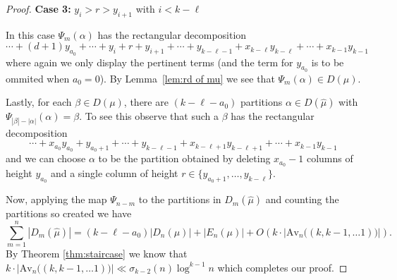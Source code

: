 \documentclass{article}
\theoremstyle{plain}
\newtheorem{lemma}[theorem]{Lemma}
\theoremstyle{definition}
\newcommand{\Av}{\text{Av}}
\begin{document}
\begin{proof}
\medskip\noindent
\textbf{Case 3:} $y_i> r >y_{i+1}$ with $i< k-\ell$
\medskip

In this case $\Psi_m(\alpha)$ has the rectangular decomposition
$$ \cdots +(d+1)y_{a_0}+ \cdots +y_i +r+ y_{i+1}+\cdots + y_{k-\ell-1}+ x_{k-\ell}y_{k-\ell} + \cdots + x_{k-1}y_{k-1}$$
where again we only display the pertinent terms (and the term for $y_{a_0}$ is to be ommited when $a_0=0$).  By Lemma~\ref{lem:rd of mu} we see that $\Psi_m(\alpha) \in D(\mu)$.

Lastly, for each $\beta\in D(\mu)$, there are $(k-\ell -a_0)$ partitions $\alpha \in D(\hat \mu)$ with $\Psi_{|\beta|-|\alpha|}(\alpha) = \beta$.  To see this observe that such a  $\beta$ has the rectangular decomposition 
$$\cdots +x_{a_0}y_{a_0}+y_{a_0+1}+ \cdots  + y_{k-\ell-1} + x_{k-\ell+1}y_{k-\ell+1} + \cdots+ x_{k-1}y_{k-1}$$
and we can choose $\alpha$ to be the partition obtained by deleting $x_{a_0}-1$ columns of height $y_{a_0}$ and a single column of height  $r \in\{y_{a_0+1},\ldots, y_{k-\ell}\}$.  

\medskip


Now, applying the map $\Psi_{n-m}$ to the partitions in $D_m(\hat \mu)$ and counting the partitions so created we have
$$\sum_{m=1}^{n} |D_m(\hat\mu)| = (k-\ell-a_0)|D_n(\mu)| + |E_n(\mu)| + O\left(k\cdot \left|\Av_n\big((k,k-1,\ldots 1)\big) \right|\right).$$
By Theorem \ref{thm:staircase} we know that $k\cdot \left|\Av_n \big((k,k-1,\ldots 1)\big) \right| \ll \sigma_{k-2}(n)\log^{k-1} n$
 which completes our proof. 
\end{proof}



\end{document}
